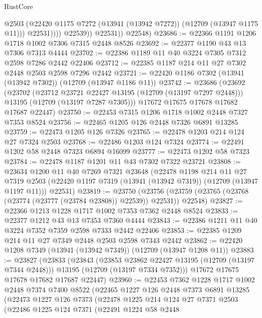 \begin{lexlean}{RustCore}
\begin{coremodule}
                      @2503
                      (@22420 @1175 @7272 (@13941 (@13942 @7272)) (@12709 (@13947 @1175 @11)))
                      @22531))))
              @22539))
          @22531))
      @22548)
@23686 := @22366 @1191 @1206 @1718 @1002 @7306 @7315 @2448 @8526
@23692 := @22377 @1190 @43 @13 @7306 @7313 @4444
@23702 := @22386 @1189 @11 @40 @3224 @7305 @7312 @2598 @7286 @2442 @22406
@23712 := @22385 @1187 @214 @11 @27 @7302 @2448 @2503 @2598 @7296 @2442
@23721 := @22420 @1186 @7302 (@13941 (@13942 @7302)) (@12709 (@13947 @1186 @11))
@23742 := @23686
    (@23692
      (@23702
        (@23712 @23721 @22427 @13195 (@12709 (@13197 @7297 @2448)))
        @13195
        (@12709 (@13197 @7287 @7305)))
      @17672
      @17675
      @17678
      @17682
      @17687
      @22447)
@23750 := @22453 @7315 @1206 @1718 @1002 @2448 @7327 @7353 @8524
@23756 := @22465 @1205 @126 @2448 @7326 @6891 @13285
@23759 := @22473 @1205 @126 @7326
@23765 := @22478 @1203 @214 @124 @27 @7324 @2503
@23768 := @22486 @1203 @124 @7324
@23774 := @22491 @1202 @58 @2448 @7323 @6894 @16099
@23777 := @22473 @1202 @58 @7323
@23784 := @22478 @1187 @1201 @11 @43 @7302 @7322 @23721
@23808 := @23634
    @1200
    @11
    @40
    @7269
    @7321
    @23648
    (@22478
      @1198
      @214
      @11
      @27
      @7319
      @2503
      (@22420 @1197 @7319 (@13941 (@13942 @7319)) (@12709 (@13947 @1197 @11)))
      @22531)
@23819 := @23750
    (@23756 (@23759 (@23765 (@23768 (@23774 (@23777 (@23784 @23808)) @22539)) @22531)) @22548)
@23827 := @22366 @1213 @1228 @1717 @1002 @7353 @7362 @2448 @8524
@23833 := @22377 @1212 @43 @13 @7353 @7360 @4444
@23843 := @22386 @1211 @11 @40 @3224 @7352 @7359 @2598 @7333 @2442 @22406
@23853 := @22385 @1209 @214 @11 @27 @7349 @2448 @2503 @2598 @7343 @2442
@23862 := @22420 @1208 @7349 (@13941 (@13942 @7349)) (@12709 (@13947 @1208 @11))
@23883 := @23827
    (@23833
      (@23843
        (@23853 @23862 @22427 @13195 (@12709 (@13197 @7344 @2448)))
        @13195
        (@12709 (@13197 @7334 @7352)))
      @17672
      @17675
      @17678
      @17682
      @17687
      @22447)
@23960 := @22453
    @7362
    @1228
    @1717
    @1002
    @2448
    @7374
    @7400
    @8522
    (@22465
      @1227
      @126
      @2448
      @7373
      @6891
      @13285
      (@22473
        @1227
        @126
        @7373
        (@22478
          @1225
          @214
          @124
          @27
          @7371
          @2503
          (@22486
            @1225
            @124
            @7371
            (@22491
              @1224
              @58
              @2448

\end{coremodule}
\end{lexlean}
